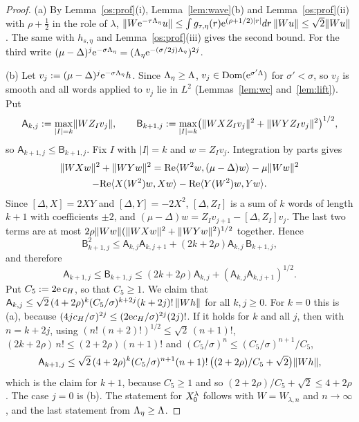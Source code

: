 \begin{proof}
(a) By Lemma~\ref{os:prof}(i), Lemma~\ref{lem:wave}(b) and Lemma~\ref{os:prof}(ii) with $\rho+\tfrac12$ in the role of $\lambda$,
$\lVert W\mathrm{e}^{-\tau\Lambda_\eta}u\rVert\le\int g_{\tau,\eta}(r)\mathrm{e}^{(\rho+1/2)|r|}dr\,\lVert Wu\rVert\le\sqrt2\lVert Wu\rVert$. The same with $h_{s,\eta}$ and Lemma~\ref{os:prof}(iii) gives the second
bound. For the third write $(\mu-\Delta)^j\mathrm{e}^{-\sigma\Lambda_\eta}=(\Lambda_\eta\mathrm{e}^{-(\sigma/2j)\Lambda_\eta})^{2j}$.

(b) Let $v_j:=(\mu-\Delta)^j\mathrm{e}^{-\sigma\Lambda_\eta}h$. Since $\Lambda_\eta\ge\Lambda$, $v_j\in\operatorname{Dom}(\mathrm{e}^{\sigma'\Lambda})$ for $\sigma'<\sigma$, so $v_j$ is smooth
and all words applied to $v_j$ lie in $L^2$ (Lemmas~\ref{lem:wc} and~\ref{lem:lift}). Put
\[
\mathsf A_{k,j}:=\max_{|I|=k}\lVert WZ_Iv_j\rVert,\qquad\mathsf B_{k+1,j}:=\max_{|I|=k}\bigl(\lVert WXZ_Iv_j\rVert^2+\lVert WYZ_Iv_j\rVert^2\bigr)^{1/2},
\]
so $\mathsf A_{k+1,j}\le\mathsf B_{k+1,j}$. Fix $I$ with $|I|=k$ and $w=Z_Iv_j$. Integration by parts gives
\begin{multline*}
\lVert WXw\rVert^2+\lVert WYw\rVert^2=\mathrm{Re}\langle W^2w,(\mu-\Delta)w\rangle-\mu\lVert Ww\rVert^2\\
-\mathrm{Re}\langle X(W^2)w,Xw\rangle-\mathrm{Re}\langle Y(W^2)w,Yw\rangle .
\end{multline*}
Since $[\Delta,X]=2XY$ and $[\Delta,Y]=-2X^2$, $[\Delta,Z_I]$ is a sum of $k$ words of length $k+1$ with coefficients $\pm2$, and
$(\mu-\Delta)w=Z_Iv_{j+1}-[\Delta,Z_I]v_j$. The last two terms are at most $2\rho\lVert Ww\rVert(\lVert WXw\rVert^2+\lVert WYw\rVert^2)^{1/2}$ together. Hence
\[
\mathsf B_{k+1,j}^2\le\mathsf A_{k,j}\mathsf A_{k,j+1}+(2k+2\rho)\mathsf A_{k,j}\,\mathsf B_{k+1,j},
\]
and therefore
\[
\mathsf A_{k+1,j}\le\mathsf B_{k+1,j}\le(2k+2\rho)\mathsf A_{k,j}+(\mathsf A_{k,j}\mathsf A_{k,j+1})^{1/2}.
\]
Put $C_5:=2\mathrm{e}\,c_H$, so that $C_5\ge1$. We claim that
$\mathsf A_{k,j}\le\sqrt2\,(4+2\rho)^k(C_5/\sigma)^{k+2j}(k+2j)!\,\lVert Wh\rVert$ for all $k,j\ge0$. For $k=0$ this is (a), because $(4jc_H/\sigma)^{2j}\le(2\mathrm{e} c_H/\sigma)^{2j}(2j)!$. If it holds for $k$ and all $j$, then with $n=k+2j$, using $(n!\,(n+2)!)^{1/2}\le\sqrt2\,(n+1)!$,
$(2k+2\rho)\,n!\le(2+2\rho)(n+1)!$ and $(C_5/\sigma)^n\le(C_5/\sigma)^{n+1}/C_5$,
\[
\mathsf A_{k+1,j}\le\sqrt2\,(4+2\rho)^k(C_5/\sigma)^{n+1}(n+1)!\,\bigl((2+2\rho)/C_5+\sqrt2\bigr)\lVert Wh\rVert,
\]
which is the claim for $k+1$, because $C_5\ge1$ and so $(2+2\rho)/C_5+\sqrt2\le4+2\rho$. The case $j=0$ is (b). The statement for $X_0^\lambda$ follows with $W=W_{\lambda,n}$ and $n\to\infty$, and the last
statement from $\Lambda_\eta\ge\Lambda$.
\end{proof}

